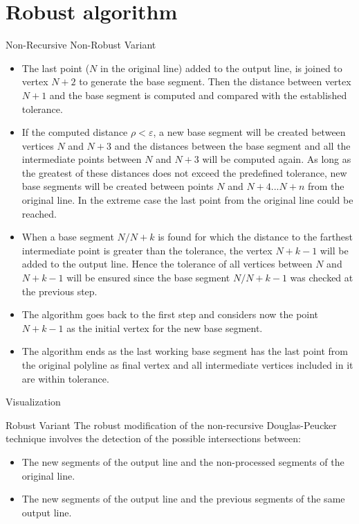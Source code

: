 \documentclass[10pt]{beamer}
\begin{document}
\section{Robust algorithm}

\begin{frame}{Non-Recursive Non-Robust Variant}
	\begin{itemize}
		\item The last point ($N$ in the original line) added to the output line,
			  is joined to vertex $N+2$ to generate the base segment. 
			  Then the distance between vertex $N+1$ and the base segment 
			  is computed and compared with the established tolerance.
		\item If the computed distance $\rho < \varepsilon$, a new
			  base segment will be created between vertices $N$ and $N + 3$ and
			  the distances between the base segment and all the intermediate
			  points between $N$ and $N + 3$ will be computed again. As long as 
			  the greatest of these distances does not exceed the predefined
			  tolerance, new base segments will be created between points $N$
			  and $N + 4...N + n$ from the original line. In the extreme case the
			  last point from the original line could be reached.
		\item When a base segment $N/N + k$ is found for which the distance to
			  the farthest intermediate point is greater than the tolerance,
			  the vertex $N + k - 1$ will be added to the output line. Hence the
	          tolerance of all vertices between $N$ and $N + k - 1$ will be ensured
			  since the base segment $N/N + k - 1$ was checked at the previous
			  step.
		\item The algorithm goes back to the first step and considers now the
			  point $N + k - 1$ as the initial vertex for the new base segment.
		\item The algorithm ends as the last working base segment has the
			  last point from the original polyline as final vertex and all
			  intermediate vertices included in it are within tolerance.
	\end{itemize}

\end{frame}

\begin{frame}{Visualization}
\end{frame}


\begin{frame}{Robust Variant}
	The robust modification of the non-recursive Douglas-Peucker technique 
	involves the detection of the possible intersections between:
	\begin{itemize}
		\item The new segments of the output line and the non-processed
			  segments of the original line.
		\item The new segments of the output line and the previous 
			  segments of the same output line.
	\end{itemize}		
\end{frame}	
\end{document}
